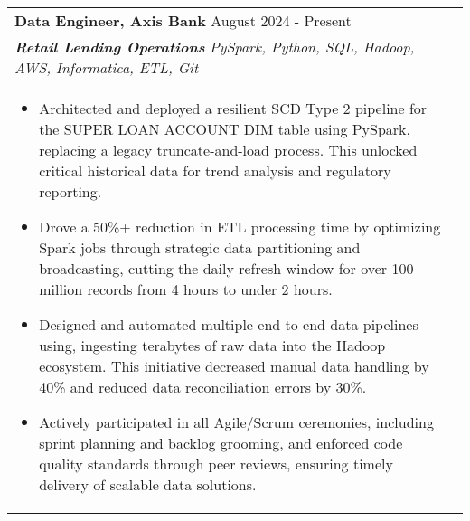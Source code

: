 \documentclass[a4paper,8pt]{article}
\begin{document}
\begin{tabularx}{\linewidth}{ @{}l r@{} }
\color[HTML]{1C033C} \textbf{Data Engineer, Axis Bank} \hfill \color[HTML]{371e77} August 2024 - Present\\[3pt]
\color[HTML]{371e77}\textbf{\textit{Retail Lending Operations}} \hfill \color[HTML]{4B28A4} \textit{PySpark, Python, SQL, Hadoop, AWS, Informatica, ETL, Git} \\[4pt]
\begin{minipage}[t]{\linewidth}
    \begin{itemize}[nosep,after=\strut, leftmargin=2em, itemsep=1pt] 
    \item Architected and deployed a resilient SCD Type 2 pipeline for the SUPER LOAN ACCOUNT DIM table using PySpark, replacing a legacy truncate-and-load process. This unlocked critical historical data for trend analysis and regulatory reporting.
    \item Drove a 50\%+ reduction in ETL processing time by optimizing Spark jobs through strategic data partitioning and broadcasting, cutting the daily refresh window for over 100 million records from 4 hours to under 2 hours.
    \item Designed and automated multiple end-to-end data pipelines using, ingesting terabytes of raw data into the Hadoop ecosystem. This initiative decreased manual data handling by 40\% and reduced data reconciliation errors by 30\%.
    \item Actively participated in all Agile/Scrum ceremonies, including sprint planning and backlog grooming, and enforced code quality standards through peer reviews, ensuring timely delivery of scalable data solutions.
    \end{itemize}
\end{minipage}
\end{tabularx}

\end{document}
